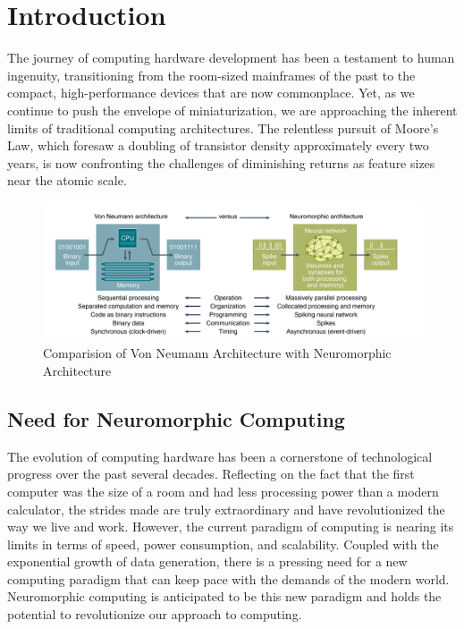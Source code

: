\documentclass[screen, acmtog]{acmart}
\begin{document}
\section{Introduction}

The journey of computing hardware development has been a testament to human ingenuity, transitioning from the room-sized mainframes of the past to the compact, high-performance devices that are now commonplace. Yet, as we continue to push the envelope of miniaturization, we are approaching the inherent limits of traditional computing architectures. The relentless pursuit of Moore’s Law, which foresaw a doubling of transistor density approximately every two years, is now confronting the challenges of diminishing returns as feature sizes near the atomic scale.

\begin{figure}
    \centering
    \includegraphics[width=1\linewidth]{comparevonneuro.png}
    \caption{Comparision of Von Neumann Architecture with Neuromorphic Architecture \cite{NCalgo}}
    \label{fig:comparevonneuro}
\end{figure}

\subsection{Need for Neuromorphic Computing} 

The evolution of computing hardware has been a cornerstone of technological progress over the past several decades. Reflecting on the fact that the first computer was the size of a room and had less processing power than a modern calculator, the strides made are truly extraordinary and have revolutionized the way we live and work. However, the current paradigm of computing is nearing its limits in terms of speed, power consumption, and scalability. Coupled with the exponential growth of data generation, there is a pressing need for a new computing paradigm that can keep pace with the demands of the modern world. Neuromorphic computing is anticipated to be this new paradigm and holds the potential to revolutionize our approach to computing.
\end{document}
